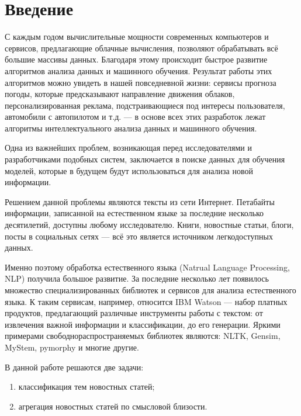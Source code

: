 \documentclass[a4paper, 14pt]{extarticle}
\begin{document}

\section{Введение}
С каждым годом вычислительные мощности современных компьютеров и сервисов, 
предлагающие облачные вычисления, позволяют 
обрабатывать всё большие массивы данных. Благодаря этому происходит быстрое 
развитие алгоритмов анализа данных и машинного обучения. Результат работы 
этих алгоритмов можно увидеть в нашей повседневной жизни: 
сервисы прогноза погоды, которые предсказывают направление движения 
облаков, персонализированная реклама, подстраивающиеся под 
интересы пользователя, автомобили с автопилотом и т.д. --- в основе всех 
этих разработок лежат алгоритмы интеллектуального анализа данных и 
машинного обучения.

Одна из важнейших проблем, возникающая перед исследователями и 
разработчиками подобных систем, заключается в поиске данных для обучения моделей,
которые в будущем будут использоваться для анализа новой информации.

Решением данной проблемы являются тексты из сети Интернет.
Петабайты информации, записанной на естественном языке за последние несколько 
десятилетий, доступны любому исследователю. Книги, новостные статьи, блоги, посты в 
социальных сетях --- всё это является источником легкодоступных данных.

Именно поэтому обработка естественного языка (Natrual Language Processing, 
NLP) получила большое развитие. За последние несколько лет появилось множество 
специализированных библиотек и сервисов для анализа естественного языка. К таким сервисам, 
например, относится IBM Watson --- набор платных продуктов, предлагающий различные
инструменты работы с текстом: от извлечения важной информации и 
классификации, до его генерации. %
Яркими примерами свободнораспространяемых библиотек являются: NLTK, Gensim, MyStem,
pymorphy и многие другие.

В данной работе решаются две задачи:
\begin{enumerate}
	\item классификация тем новостных статей;
	\item агрегация новостных статей по смысловой близости.
\end{enumerate} 
\end{document}

